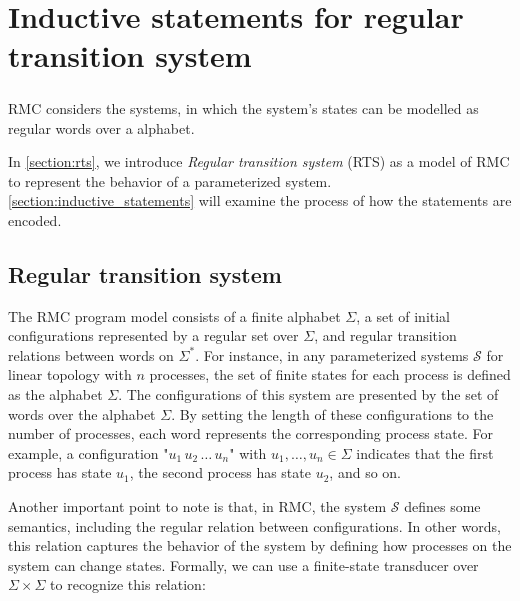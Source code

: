 \chapter{Inductive statements for regular transition system}\label{chapter:inductive_statement}
\paragraph*{}
RMC considers the systems, in which the system's states can be modelled as regular words 
over a alphabet.

In \autoref{section:rts}, we introduce \textit{Regular transition system} (RTS)
as a model of RMC to represent the behavior of a parameterized system.
\autoref{section:inductive_statements} will examine the process of how the statements are encoded.

\section{Regular transition system}\label{section:rts}
The RMC program model consists of a finite alphabet $\Sigma$, 
a set of initial configurations represented by a regular set over $\Sigma$, 
and regular transition relations between words on $\Sigma^*$.
For instance, in any parameterized systems $\mathcal{S}$ for linear topology with $n$ processes, 
the set of finite states for each process is defined as the alphabet $\Sigma$.
The configurations of this system are presented by the set of words over the alphabet $\Sigma$.
By setting the length of these configurations to the number of processes, 
each word represents the corresponding process state.
For example, a configuration "$u_1 \, u_2 \, \dots \, u_n$" with $u_1,\dots,u_n \in \Sigma$ indicates that the first process 
has state $u_1$, the second process has state $u_2$, and so on.

Another important point to note is that, in RMC, the system $\mathcal{S}$ defines some semantics, 
including the regular relation between configurations. 
In other words, this relation captures the behavior of the system by defining 
how processes on the system can change states.
Formally, we can use a finite-state transducer over $\Sigma \times \Sigma$ to recognize this relation:

